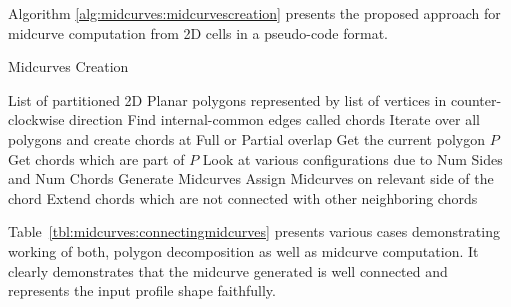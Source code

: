 \begin{table}[!h]
\begin{tabular}[h]{@{}p{0.15\linewidth}@{} p{0.18\linewidth} @{}p{0.5\linewidth} p{0.15\linewidth}@{}}
%
\bottomrule

\end{tabular}
\end{table}

\bigskip

Algorithm \ref{alg:midcurves:midcurvescreation} presents the proposed approach for midcurve computation from 2D cells in a pseudo-code format.

\bigskip

\begin{algorithm}[H]
	\caption{Midcurves Creation}
	\label{alg:midcurves:midcurvescreation}
	\begin{algorithmic}[1]
		\REQUIRE List of partitioned 2D Planar polygons represented by list of vertices in counter-clockwise direction
		\STATE Find internal-common edges called chords
		\STATE Iterate over all polygons and create chords at Full or Partial overlap
			\STATE Get the current polygon $P$
			\STATE Get chords which are part of $P$
			\STATE Look at various configurations due to Num Sides and Num Chords
			\STATE Generate Midcurves
			\STATE Assign Midcurves on relevant side of the chord
		\ENDWHILE
		\STATE Extend chords which are not connected with other neighboring chords
	\end{algorithmic}
\end{algorithm}

\bigskip

Table~\ref{tbl:midcurves:connectingmidcurves} presents various cases demonstrating working of both, polygon decomposition as well as midcurve computation. It clearly demonstrates that the midcurve generated is well connected and represents the input profile shape faithfully.

